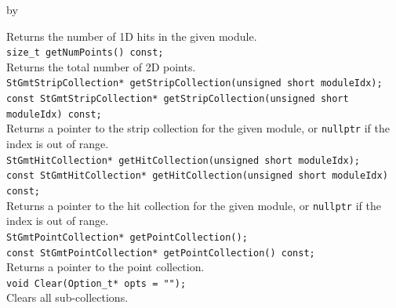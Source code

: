 \documentclass[twoside]{article}
\newcommand{\entrylabel}[1]{\mbox{\textbf{{#1}}}\hfil}%
\newenvironment{entry}
{\begin{list}{}%
    {\renewcommand{\makelabel}{\entrylabel}%
     \setlength{\labelwidth}{90pt}%
     \setlength{\leftmargin}{\labelwidth}
     \advance\leftmargin by \labelsep%
      }%
    }%
  {\end{list}}
\newcommand{\Entrylabel}[1]%
{\raisebox{0pt}[1ex][0pt]{\makebox[\labelwidth][l]%
    {\parbox[t]{\labelwidth}{\hspace{0pt}\textbf{{#1}}}}}}
\newenvironment{Entry}%
{\renewcommand{\entrylabel}{\Entrylabel}\begin{entry}}%
  {\end{entry}}
\begin{document}
\begin{Entry}
    Returns the number of 1D hits in the given module.\\
    \verb+size_t getNumPoints() const;+\\
    Returns the total number of 2D points.\\
    \verb+StGmtStripCollection* getStripCollection(unsigned short moduleIdx);+\\
    \verb+const StGmtStripCollection* getStripCollection(unsigned short moduleIdx) const;+\\
    Returns a pointer to the strip collection for the given module, or
    \texttt{nullptr} if the index is out of range.\\
    \verb+StGmtHitCollection* getHitCollection(unsigned short moduleIdx);+\\
    \verb+const StGmtHitCollection* getHitCollection(unsigned short moduleIdx) const;+\\
    Returns a pointer to the hit collection for the given module, or
    \texttt{nullptr} if the index is out of range.\\
    \verb+StGmtPointCollection* getPointCollection();+\\
    \verb+const StGmtPointCollection* getPointCollection() const;+\\
    Returns a pointer to the point collection.\\
    \verb+void Clear(Option_t* opts = "");+\\
    Clears all sub-collections.\\
\end{Entry}
\clearpage

\end{document}

